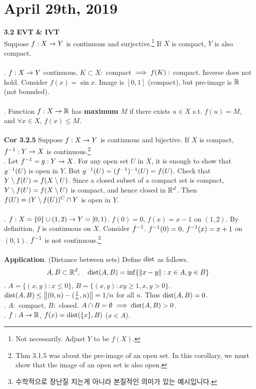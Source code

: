 \section*{April 29th, 2019}
\textbf{3.2 EVT \& IVT}\\
 Suppose $f: X\rightarrow Y$ is continuous and surjective.\footnote{Not necessarily. Adjust $ Y $ to be $ f(X) $.} If $X$ is compact, $Y$ is also compact.\\
\\
\rmk. $f:X\rightarrow Y$ continuous, $K\subset X:$ compact $\implies f(K):$ compact. Inverse does not hold. Consider $f(x) = \sin x $. Image is $[0, 1]$ (compact), but pre-image is $\mathbb{R}$ (not bounded).\\
\\
. Function $f:X\rightarrow \mathbb{R}$ has \textbf{maximum} $M$ if there exists $u\in X$ s.t. $f(u) = M$, and $\forall x\in X$, $f(x) \leq M$.\\
\\
\textbf{Cor 3.2.5} Suppose $f:X\rightarrow Y$ is continuous and bijective. If $X$ is compact, $f^{-1}: Y\rightarrow X$ is continuous.\footnote{Thm 3.1.5 was about the pre-image of an open set. In this corollary, we must show that the image of an open set is also open.}\\
\pf. Let $f^{-1} = g: Y\rightarrow X$. For any open set $U$ in $X$, it is enough to show that $g^{-1}(U)$ is open in $Y$. But $g^{-1}(U) = (f^{-1})^{-1}(U) = f(U)$. Check that $Y\setminus f(U) = f(X\setminus U)$. Since a closed subset of a compact set is compact, $Y\setminus f(U) = f(X\setminus U)$ is compact, and hence closed in $\mathbb{R}^d$. Then $f(U) = (Y\setminus f(U))^C \cap Y$ is open in $Y$.\\
\\
\ex. $f: X = \{0\}\cup (1, 2)\rightarrow Y = [0, 1)$. $f(0) = 0$, $f(x) = x - 1$ on $(1, 2)$. By definition, $f$ is continuous on $X$. Consider $f^{-1}$. $f^{-1}(0) = 0$, $f^{-1}(x) = x + 1$ on $(0, 1)$. $f^{-1}$ is not continuous.\footnote{수학적으로 장난질 치는게 아니라 본질적인 의미가 있는 예시입니다.}\\
\\
\textbf{Application}. (Distance between sets) Define $\text{dist}$ as follows. $$A, B\subset \mathbb{R}^d,\quad \text{dist}(A, B) = \inf \{\left\lVert x-y\right\rVert:x\in A, y\in B \}$$
\ex. $A = \{(x, y): x\leq 0\}$, $B = \{(x, y):xy\geq 1, x, y>0 \}$. $\text{dist}(A, B) \leq \left\lVert(0, n) - (\frac{1}{n}, n)\right\rVert = 1/n$ for all $n$. Thus $\text{dist}(A, B) = 0$.\\
\thm. $A:$ compact, $B:$ closed. $A\cap B = \emptyset \implies \text{dist}(A, B)>0$.\\
\pf. $f:A\rightarrow \mathbb{R}$, $f(x) = \text{dist}(\{x\}, B)$ ($x\in A$).
